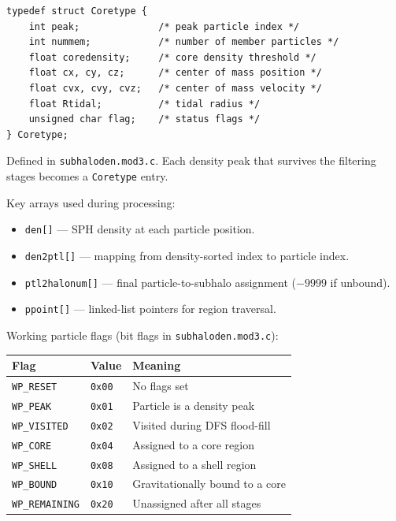 \documentclass[11pt,fleqn]{book}
\newcommand{\code}[1]{\texttt{#1}}
\newcommand{\file}[1]{\texttt{#1}}
\begin{document}
\begin{definition}[Coretype]
\begin{lstlisting}[style=ccode,numbers=none]
typedef struct Coretype {
    int peak;              /* peak particle index */
    int nummem;            /* number of member particles */
    float coredensity;     /* core density threshold */
    float cx, cy, cz;      /* center of mass position */
    float cvx, cvy, cvz;   /* center of mass velocity */
    float Rtidal;          /* tidal radius */
    unsigned char flag;    /* status flags */
} Coretype;
\end{lstlisting}
Defined in \file{subhaloden.mod3.c}.  Each density peak that survives the filtering stages becomes a \code{Coretype} entry.
\end{definition}

Key arrays used during processing:
\begin{itemize}[leftmargin=2em]
  \item \code{den[]} --- SPH density at each particle position.
  \item \code{den2ptl[]} --- mapping from density-sorted index to particle index.
  \item \code{ptl2halonum[]} --- final particle-to-subhalo assignment ($-9999$ if unbound).
  \item \code{ppoint[]} --- linked-list pointers for region traversal.
\end{itemize}

Working particle flags (bit flags in \file{subhaloden.mod3.c}):
\begin{longtable}{L{4.5cm} C{2cm} L{7cm}}
\toprule
\textbf{Flag} & \textbf{Value} & \textbf{Meaning} \\
\midrule
\endhead
\code{WP\_RESET}     & \code{0x00} & No flags set \\
\code{WP\_PEAK}      & \code{0x01} & Particle is a density peak \\
\code{WP\_VISITED}   & \code{0x02} & Visited during DFS flood-fill \\
\code{WP\_CORE}      & \code{0x04} & Assigned to a core region \\
\code{WP\_SHELL}     & \code{0x08} & Assigned to a shell region \\
\code{WP\_BOUND}     & \code{0x10} & Gravitationally bound to a core \\
\code{WP\_REMAINING} & \code{0x20} & Unassigned after all stages \\
\bottomrule
\end{longtable}
\end{document}
